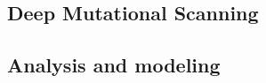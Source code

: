 \documentclass{article}
\begin{document}
%

\subsection*{Deep Mutational Scanning}

\subsection*{Analysis and modeling}
\end{document}
